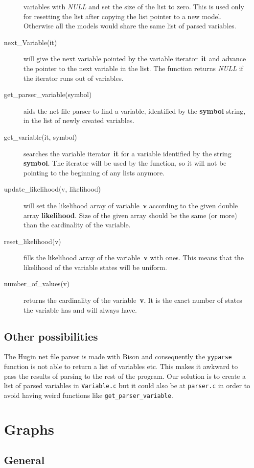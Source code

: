 \documentclass[12pt,a4paper]{report}
\begin{document}
\begin{description}
variables with {\it NULL} and set the size of the list to zero. This
is used only for resetting the list after copying the list pointer
to a new model. Otherwise all the models would share the same list of
parsed variables.
\item[next\_Variable(it)] will give the next variable pointed by the
variable iterator~\textbf{it} and advance the pointer to the next
variable in the list. The function returns {\it NULL} if the iterator
runs out of variables.
\item[get\_parser\_variable(symbol)] aids the net file parser to find a
variable, identified by the \textbf{symbol} string, in the list of newly
created variables.
\item[get\_variable(it, symbol)] searches the
variable iterator~\textbf{it} for a variable identified by the string
\textbf{symbol}. The iterator will be used by the function, so it will
not be pointing to the beginning of any lists anymore.
\item[update\_likelihood(v, likelihood)] will set the likelihood array
of variable~\textbf{v} according to the given double array 
\textbf{likelihood}. Size of the given array should be the same 
(or more) than the cardinality of the variable.
\item[reset\_likelihood(v)] fills the likelihood array of the
variable~\textbf{v} with ones. This means that the likelihood of the
variable states will be uniform.
\item[number\_of\_values(v)] returns the cardinality of the
variable~\textbf{v}. It is the exact number of states the variable has
and will always have.
\end{description}


\subsection{Other possibilities}
The Hugin net file parser is made with Bison and consequently the 
\verb+yyparse+ function is not able to return a list of variables etc. 
This makes it awkward to pass the results of parsing to the rest of the
program. Our solution is to create a list of parsed variables in
\verb+Variable.c+ but it could also be at \verb+parser.c+ in order to
avoid having weird functions like \verb+get_parser_variable+.


\newpage
\section{Graphs}
\subsection{General}
\end{document}
